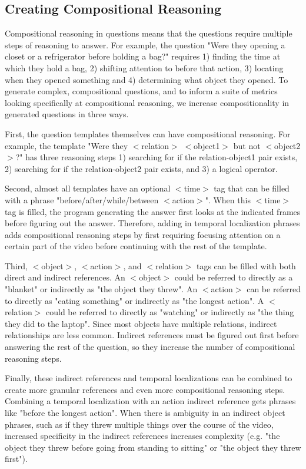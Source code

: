 \documentclass[10pt,twocolumn,letterpaper]{article}
\begin{document}
\subsection{Creating Compositional Reasoning}

Compositional reasoning in questions means that the questions require multiple steps of reasoning to answer. For example, the question "Were they opening a closet or a refrigerator before holding a bag?" requires 1) finding the time at which they hold a bag, 2) shifting attention to before that action, 3) locating when they opened something and 4) determining what object they opened. To generate complex, compositional questions, and to inform a suite of metrics looking specifically at compositional reasoning, we increase compositionality in generated questions in three ways.

First, the question templates themselves can have compositional reasoning. For example, the template "Were they $<$relation$>$ $<$object1$>$ but not $<$object2$>$?" has three reasoning steps 1) searching for if the relation-object1 pair exists, 2) searching for if the relation-object2 pair exists, and 3) a logical operator. 

Second, almost all templates have an optional $<$time$>$ tag that can be filled with a phrase "before/after/while/between $<$action$>$". When this $<$time$>$ tag is filled, the program generating the answer first looks at the indicated frames before figuring out the answer. Therefore, adding in temporal localization phrases adds compositional reasoning steps by first requiring focusing attention on a certain part of the video before continuing with the rest of the template.

Third, $<$object$>$, $<$action$>$, and $<$relation$>$ tags can be filled with both direct and indirect references. An $<$object$>$ could be referred to directly as a "blanket" or indirectly as "the object they threw". An $<$action$>$ can be referred to directly as "eating something" or indirectly as "the longest action". A $<$relation$>$ could be referred to directly as "watching" or indirectly as "the thing they did to the laptop". Since most objects have multiple relations, indirect relationships are less common. Indirect references must be figured out first before answering the rest of the question, so they increase the number of compositional reasoning steps.

Finally, these indirect references and temporal localizations can be combined to create more granular references and even more compositional reasoning steps. Combining a temporal localization with an action indirect reference gets phrases like "before the longest action". When there is ambiguity in an indirect object phrases, such as if they threw multiple things over the course of the video, increased specificity in the indirect references increases complexity (e.g. "the object they threw before going from standing to sitting" or "the object they threw first").
\end{document}
